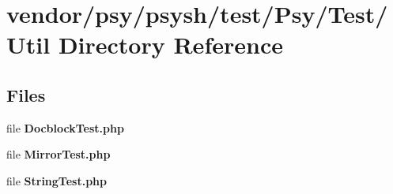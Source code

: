 \section{vendor/psy/psysh/test/\+Psy/\+Test/\+Util Directory Reference}
\label{dir_72cccd2d606ba5e82e718d7cd32c970b}
\subsection*{Files}
\begin{DoxyCompactItemize}
\item 
file {\bf Docblock\+Test.\+php}
\item 
file {\bf Mirror\+Test.\+php}
\item 
file {\bf String\+Test.\+php}
\end{DoxyCompactItemize}
